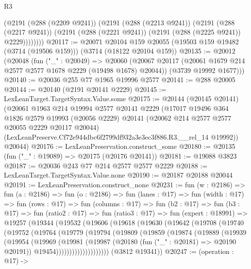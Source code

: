 \begin{lexlean}{R3}
\begin{coremodule}
          (@2191
            (@288 (@2209 @9241))
            (@2191
              (@288 (@2213 @9241))
              (@2191
                (@288 (@2217 @9241))
                (@2191 (@288 (@2221 @9241)) (@2191 (@288 (@2225 @9241)) @2229))))))))
@20117 := @20071
    @20104
    @159
    @20055
    (@19503 @159 @19482 (@3714 (@19506 @159)))
    (@3714 (@18122 @20104 @159))
@20135 := @20012
    (@20048
      (fun ("_" : @20049) =>
      @20060
        (@20067 @20117 (@20061 @1679 @214 @2577 @2577 @1678 @2229 (@19498 @1678) @20044))
        (@3739 @19992 @1677)))
@20140 := @20036 @255 @77 @1965 @19996 @2577
@20141 := @288 @20005
@20144 := @20140 (@2191 @20141 @2229)
@20145 := LexLeanTarget.TargetSyntax.Value.some
@20175 := @20144
    (@20145 @20141)
    (@20061
      @1963
      @214
      @19994
      @2577
      @20141
      @2229
      (@17017
        @19496
        @364
        @1826
        @2579
        @19993
        (@20056 @2229)
        @20141
        (@20062 @214 @2577 @2577 @20055 @2229 @20117 @20044)
        (LexLeanPreserve.Cf72e944dbc6f2799df932a3e3ec3f886.R3.__rel_14 @19992))
      @20044)
@20176 := LexLeanPreservation.construct_some
@20180 := @20135 (fun ("_" : @19089) => @20175 (@20176 @20141))
@20181 := @19088 @3823
@20187 := @20036 @243 @77 @214 @2577 @2577 @2229
@20188 := LexLeanTarget.TargetSyntax.Value.none
@20190 := @20187 @20188 @20044
@20191 := LexLeanPreservation.construct_none
@20231 := fun (w : @2186) =>
  fun (a : @2186) =>
  fun (o : @2186) =>
  fun (lanes : @17) =>
  fun (width : @17) =>
  fun (rows : @17) =>
  fun (columns : @17) =>
  fun (b2 : @17) =>
  fun (b3 : @17) =>
  fun (ratio2 : @17) =>
  fun (ratio3 : @17) =>
  fun (expert : @18991) =>
  @19257
    (@19344
      (@19532
        (@19606
          (@19618
            (@19630
              (@19642
                (@19708
                  (@19740
                    (@19752
                      (@19764
                        (@19779
                          (@19794
                            (@19809
                              (@19859
                                (@19874
                                  (@19889
                                    (@19939
                                      (@19954
                                        (@19969
                                          (@19981
                                            (@19987
                                              (@20180 (fun ("_" : @20181) => @20190 @20191))
                                              @19454))))))))))))))))))))
      (@3812 @19341))
@20247 := (operation : @17) ->

\end{coremodule}
\end{lexlean}
